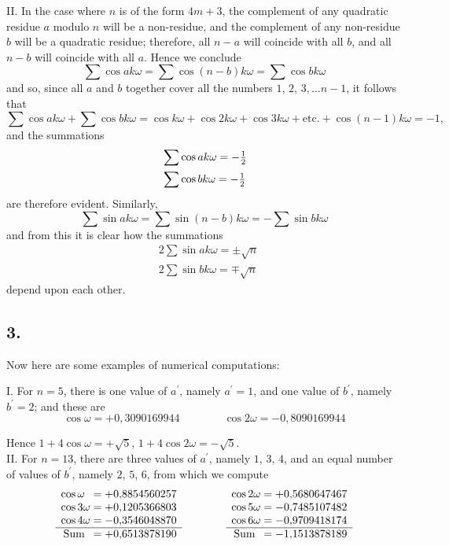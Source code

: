 \documentclass[twoside,12pt]{memoir}
\let\oldfrac\frac
\def\frac#1#2{\mathchoice{\tfrac{#1}{#2}}{\oldfrac{#1}{#2}}{\genfrac{}{}{}{2}{#1}{#2\mathstrut}}{\genfrac{}{}{}{3}{#1}{#2\mathstrut}}}
\begin{document}
II. In the case where \(n\) is of the form \(4m+3\), the complement of any quadratic residue \(a\) modulo \(n\) will be a non-residue, and the complement of any non-residue \(b\) will be a quadratic residue; therefore, all \(n-a\) will coincide with all \(b\), and all \(n-b\) will coincide with all \(a\). Hence we conclude
\[\sum \cos a k \omega=\sum \cos (n-b) k \omega=\sum \cos b k \omega\]
and so, since all \(a\) and \(b\) together cover all the numbers \(1\), \(2\), \(3, \ldots n-1\), it follows that 
\[\sum \cos a k \omega+\sum \cos b k \omega=\cos k \omega+\cos 2 k \omega+\cos 3 k \omega+\text{etc{.}}+\cos (n-1) k \omega=-1,\]
and the summations
\[\begin{aligned}
& \sum \cos a k \omega=-\frac{1}{2} \\
& \sum \cos b k \omega=-\frac{1}{2}
\end{aligned}\]
are therefore evident. Similarly,
\[\sum \sin a k \omega=\sum \sin (n-b) k \omega=-\sum \sin b k \omega\]
and from this it is clear how the summations
\[\begin{aligned}
& 2\sum \sin a k \omega= \pm \sqrt{n} \\
& 2\sum \sin b k \omega= \mp \sqrt{n}
\end{aligned}\]
depend upon each other.
%

\subsection*{3.}

Now here are some examples of numerical computations:

I. For \(n=5\), there is one value of \(a^{\prime}\), namely \(a^{\prime}=1\), and one value of \(b^{\prime}\), namely \(b^{\prime}=2\); and these are
\[\cos \omega=+0{,}3090169944 \qquad \qquad \cos 2 \omega=-0{,}8090169944\]

Hence \(1+4 \cos \omega=+\surd 5\), \(1+4 \cos 2 \omega=-\surd 5\).\\
%

II. For \(n=13\), there are three values of \(a^{\prime}\), namely \(1\), \(3\), \(4\), and an equal number of values of \(b^{\prime}\), namely \(2\), \(5\), \(6\), from which we compute
\[ \begin{array}{r} 
\cos \omega\phantom{1} = + 0{,}8854560257 \\ 
\cos 3\omega = + 0{,}1205366803 \\ 
\cos 4 \omega = - 0{,}3546048870 \\ 
\hline \text{Sum\phantom{a}} = + 0{,}6513878190 \end{array} 
\qquad \qquad
\begin{array}{r} 
\cos 2\omega = + 0{,}5680647467 \\ 
\cos 5\omega = - 0{,}7485107482 \\ 
\cos 6 \omega = - 0{,}9709418174 \\ 
\hline \text{Sum\phantom{a}} = - 1{,}1513878189 \end{array} \]
 
\end{document}
